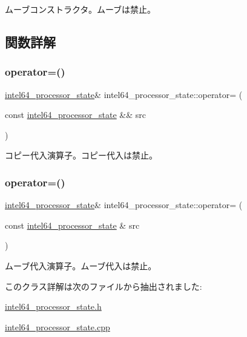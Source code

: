 ムーブコンストラクタ。ムーブは禁止。 

\subsection{関数詳解}
\hypertarget{classintel64__processor__state_af4fe969204b5cebdce8674981ad8f993}{}\label{classintel64__processor__state_af4fe969204b5cebdce8674981ad8f993} 
\subsubsection{\texorpdfstring{operator=()}{operator=()}\hspace{0.1cm}{\footnotesize\ttfamily [1/2]}}
{\footnotesize\ttfamily \hyperlink{classintel64__processor__state}{intel64\+\_\+processor\+\_\+state}\& intel64\+\_\+processor\+\_\+state\+::operator= (\begin{DoxyParamCaption}\item[{const \hyperlink{classintel64__processor__state}{intel64\+\_\+processor\+\_\+state} \&\&}]{src }\end{DoxyParamCaption})\hspace{0.3cm}{\ttfamily [delete]}}

コピー代入演算子。コピー代入は禁止。 \hypertarget{classintel64__processor__state_a32211085672078b47050e8376715676b}{}\label{classintel64__processor__state_a32211085672078b47050e8376715676b} 
\subsubsection{\texorpdfstring{operator=()}{operator=()}\hspace{0.1cm}{\footnotesize\ttfamily [2/2]}}
{\footnotesize\ttfamily \hyperlink{classintel64__processor__state}{intel64\+\_\+processor\+\_\+state}\& intel64\+\_\+processor\+\_\+state\+::operator= (\begin{DoxyParamCaption}\item[{const \hyperlink{classintel64__processor__state}{intel64\+\_\+processor\+\_\+state} \&}]{src }\end{DoxyParamCaption})\hspace{0.3cm}{\ttfamily [delete]}}

ムーブ代入演算子。ムーブ代入は禁止。 

このクラス詳解は次のファイルから抽出されました\+:\begin{DoxyCompactItemize}
\item 
\hyperlink{intel64__processor__state_8h}{intel64\+\_\+processor\+\_\+state.\+h}\item 
\hyperlink{intel64__processor__state_8cpp}{intel64\+\_\+processor\+\_\+state.\+cpp}\end{DoxyCompactItemize}
